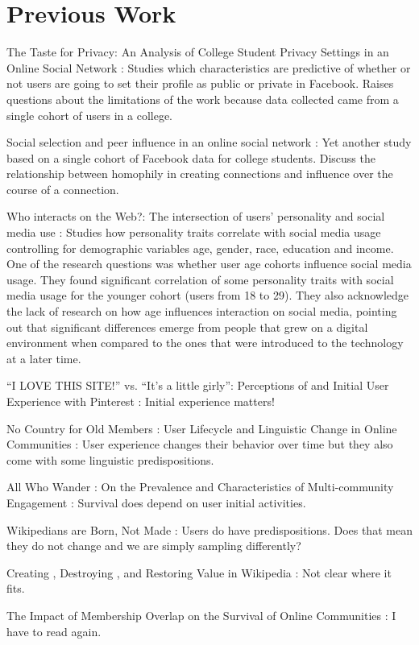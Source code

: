 \section{Previous Work}

The Taste for Privacy: An Analysis of College Student Privacy Settings in an Online Social Network \cite{Lewis2008}: Studies which characteristics are predictive of whether or not users are going to set their profile as public or private in Facebook. Raises questions about the limitations of the work because data collected came from a single cohort of users in a college.

Social selection and peer influence in an online social network \cite{Lewis2012a}: Yet another study based on a single cohort of Facebook data for college students. Discuss the relationship between homophily in creating connections and influence over the course of a connection.

Who interacts on the Web?: The intersection of users' personality and social media use \cite{Correa2010}: Studies how personality traits correlate with social media usage controlling for demographic variables age, gender, race, education and income. One of the research questions was whether user age cohorts influence social media usage. They found significant correlation of some personality traits with social media usage for the younger cohort (users from 18 to 29). They also acknowledge the lack of research on how age influences interaction on social media, pointing out that significant differences emerge from people that grew on a digital environment when compared to the ones that were introduced to the technology at a later time.

``I LOVE THIS SITE!'' vs. ``It's a little girly'': Perceptions of and Initial User Experience with Pinterest \cite{Miller2015}: Initial experience matters! 

No Country for Old Members : User Lifecycle and Linguistic Change in Online Communities \cite{Danescu-niculescu-mizil2013}: User experience changes their behavior over time but they also come with some linguistic predispositions.

All Who Wander : On the Prevalence and Characteristics of Multi-community Engagement \cite{Tan2015}: Survival does depend on user initial activities.

Wikipedians are Born, Not Made \cite{Panciera2009}: Users do have predispositions. Does that mean they do not change and we are simply sampling differently?

Creating , Destroying , and Restoring Value in Wikipedia \cite{Priedhorsky2007}: Not clear where it fits.

The Impact of Membership Overlap on the Survival of Online Communities \cite{Zhu2014}: I have to read again.
